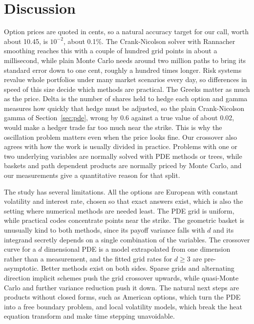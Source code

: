 \documentclass[11pt,a4paper]{article}
\begin{document}
\section{Discussion}\label{sec:discussion}

Option prices are quoted in cents, so a natural accuracy target for our call, worth about 10.45, is $10^{-2}$, about 0.1\%. The Crank-Nicolson solver with Rannacher smoothing reaches this with a couple of hundred grid points in about a millisecond, while plain Monte Carlo needs around two million paths to bring its standard error down to one cent, roughly a hundred times longer. Risk systems revalue whole portfolios under many market scenarios every day, so differences in speed of this size decide which methods are practical. The Greeks matter as much as the price. Delta is the number of shares held to hedge each option and gamma measures how quickly that hedge must be adjusted, so the plain Crank-Nicolson gamma of Section~\ref{sec:pde}, wrong by 0.6 against a true value of about 0.02, would make a hedger trade far too much near the strike. This is why the oscillation problem matters even when the price looks fine. Our crossover also agrees with how the work is usually divided in practice. Problems with one or two underlying variables are normally solved with PDE methods or trees, while baskets and path dependent products are normally priced by Monte Carlo, and our measurements give a quantitative reason for that split.

The study has several limitations. All the options are European with constant volatility and interest rate, chosen so that exact answers exist, which is also the setting where numerical methods are needed least. The PDE grid is uniform, while practical codes concentrate points near the strike. The geometric basket is unusually kind to both methods, since its payoff variance falls with $d$ and its integrand secretly depends on a single combination of the variables. The crossover curve for a $d$ dimensional PDE is a model extrapolated from one dimension rather than a measurement, and the fitted grid rates for $d \ge 3$ are pre-asymptotic. Better methods exist on both sides. Sparse grids and alternating direction implicit schemes push the grid crossover upwards, while quasi-Monte Carlo and further variance reduction push it down. The natural next steps are products without closed forms, such as American options, which turn the PDE into a free boundary problem, and local volatility models, which break the heat equation transform and make time stepping unavoidable.
\end{document}
